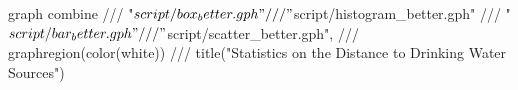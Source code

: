 graph combine ///
        "$script/box_better.gph" ///
        "$script/histogram_better.gph" ///      
        "$script/bar_better.gph" ///                                    
        "$script/scatter_better.gph", ///
        graphregion(color(white)) ///
        title("Statistics on the Distance to Drinking Water Sources")
